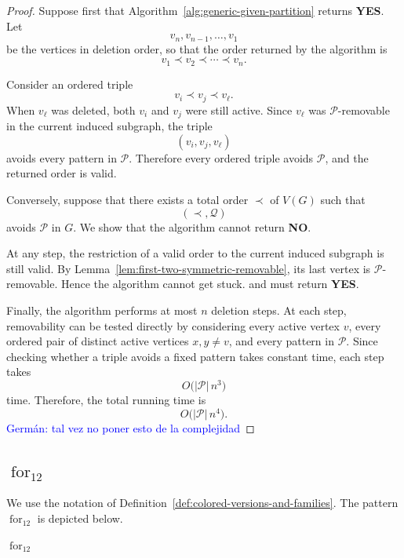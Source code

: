 \documentclass[12pt]{article}
\theoremstyle{plain}
\theoremstyle{definition}
\theoremstyle{remark}
\theoremstyle{definition}
\newcommand{\forlabel}{\mathrm{for}}
\DeclareRobustCommand{\forparam}[1]{%
  \ensuremath{\mathop{\forlabel}\nolimits_{#1}}%
}
\newcommand{\german}[1]{%
  \textcolor{blue}{Germán: #1}%
}
\begin{document}
\begin{proof}
Suppose first that Algorithm~\ref{alg:generic-given-partition} returns
\textbf{YES}. Let
\[
v_n,v_{n-1},\dots,v_1
\]
be the vertices in deletion order, so that the order returned by the
algorithm is
\[
v_1\prec v_2\prec\cdots\prec v_n.
\]

Consider an ordered triple
\[
v_i\prec v_j\prec v_\ell.
\]
When \(v_\ell\) was deleted, both \(v_i\) and \(v_j\) were still active.
Since \(v_\ell\) was \(\mathcal P\)-removable in the current induced
subgraph, the triple
\[
(v_i,v_j,v_\ell)
\]
avoids every pattern in \(\mathcal P\). Therefore every ordered triple
avoids \(\mathcal P\), and the returned order is valid.

Conversely, suppose that there exists a total order \(\prec\) of \(V(G)\)
such that
\[
(\prec,\mathcal Q)
\]
avoids \(\mathcal P\) in \(G\). We show that the algorithm cannot return
\textbf{NO}.

At any step, the restriction of a valid order to the current induced
subgraph is still valid. By
Lemma~\ref{lem:first-two-symmetric-removable}, its last vertex is
\(\mathcal P\)-removable. Hence the algorithm cannot get stuck. and must return \textbf{YES}.

Finally, the algorithm performs at most \(n\) deletion steps. At each
step, removability can be tested directly by considering every active
vertex \(v\), every ordered pair of distinct active vertices
\(x,y\neq v\), and every pattern in \(\mathcal P\). Since checking whether
a triple avoids a fixed pattern takes constant time, each step takes
\[
O\bigl(|\mathcal P|\,n^3\bigr)
\]
time. Therefore, the total running time is
\[
O\bigl(|\mathcal P|\,n^4\bigr).
\]
\german{tal vez no poner esto de la complejidad}
\end{proof}








\subsection{\texorpdfstring{\(\forparam{12}\)}{for12}}
\label{subsec:for12}

We use the notation of
Definition~\ref{def:colored-versions-and-families}.
The pattern \(\forparam{12}\) is depicted below.

\begin{center}

\smallskip
\(\forparam{12}\)
\end{center}
\end{document}
